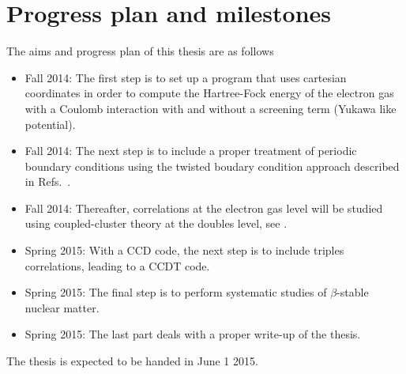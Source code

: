 \documentclass[aps,prc,twocolumn,showpacs,floatfix,nofootinbib,preprintnumbers,superscriptaddress,amsmath,amssymb]{revtex4-1}
\begin{document}
\section*{Progress plan and milestones}
The aims and progress plan of this thesis are as follows
\begin{itemize}
\item Fall 2014:  The first step is to set up a program that uses cartesian coordinates in order to compute the Hartree-Fock 
energy of the electron gas with a Coulomb interaction with and without a screening term (Yukawa like potential). 
\item Fall 2014:  The next step is to include a proper treatment of periodic boundary conditions using the twisted boudary condition
approach described in Refs.~\cite{gros1992,gros1996,lin2001}.
\item Fall 2014: Thereafter, correlations at the electron gas level
  will be studied using coupled-cluster theory at the doubles level,
  see \cite{shavittbartlett2009}.
\item Spring 2015: With a CCD code, the next step is to include triples correlations, leading to a CCDT code.
\item Spring 2015: The final step is to perform systematic studies of  $\beta$-stable nuclear matter.
\item Spring 2015: The last part deals with a proper write-up of the thesis. 
\end{itemize}
 
The thesis is expected to be handed in June 1 2015.
\end{document}
